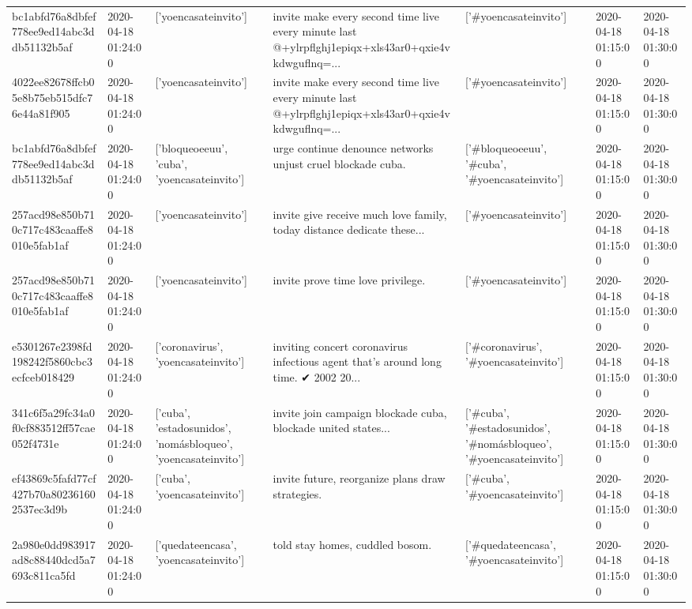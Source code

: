 \begin{tabular}{lllllll}
bc1abfd76a8dbfef778ee9ed14abc3ddb51132b5af & 2020-04-18 01:24:00 & ['yoencasateinvito'] & invite make every second time live every minute last @+ylrpflghj1epiqx+xls43ar0+qxie4vkdwguflnq=... & ['#yoencasateinvito'] & 2020-04-18 01:15:00 & 2020-04-18 01:30:00 \\
4022ee82678ffcb05e8b75eb515dfc76e44a81f905 & 2020-04-18 01:24:00 & ['yoencasateinvito'] & invite make every second time live every minute last @+ylrpflghj1epiqx+xls43ar0+qxie4vkdwguflnq=... & ['#yoencasateinvito'] & 2020-04-18 01:15:00 & 2020-04-18 01:30:00 \\
bc1abfd76a8dbfef778ee9ed14abc3ddb51132b5af & 2020-04-18 01:24:00 & ['bloqueoeeuu', 'cuba', 'yoencasateinvito'] & urge continue denounce networks unjust cruel blockade cuba. & ['#bloqueoeeuu', '#cuba', '#yoencasateinvito'] & 2020-04-18 01:15:00 & 2020-04-18 01:30:00 \\
257acd98e850b710c717c483caaffe8010e5fab1af & 2020-04-18 01:24:00 & ['yoencasateinvito'] & invite give receive much love family, today distance dedicate these... & ['#yoencasateinvito'] & 2020-04-18 01:15:00 & 2020-04-18 01:30:00 \\
257acd98e850b710c717c483caaffe8010e5fab1af & 2020-04-18 01:24:00 & ['yoencasateinvito'] & invite prove time love privilege. & ['#yoencasateinvito'] & 2020-04-18 01:15:00 & 2020-04-18 01:30:00 \\
e5301267e2398fd198242f5860cbc3ecfceb018429 & 2020-04-18 01:24:00 & ['coronavirus', 'yoencasateinvito'] & inviting concert coronavirus infectious agent that's around long time. ✔ 2002 20... & ['#coronavirus', '#yoencasateinvito'] & 2020-04-18 01:15:00 & 2020-04-18 01:30:00 \\
341c6f5a29fc34a0f0cf883512ff57cae052f4731e & 2020-04-18 01:24:00 & ['cuba', 'estadosunidos', 'nomásbloqueo', 'yoencasateinvito'] & invite join campaign blockade cuba, blockade united states... & ['#cuba', '#estadosunidos', '#nomásbloqueo', '#yoencasateinvito'] & 2020-04-18 01:15:00 & 2020-04-18 01:30:00 \\
ef43869c5fafd77cf427b70a802361602537ec3d9b & 2020-04-18 01:24:00 & ['cuba', 'yoencasateinvito'] & invite future, reorganize plans draw strategies. & ['#cuba', '#yoencasateinvito'] & 2020-04-18 01:15:00 & 2020-04-18 01:30:00 \\
2a980e0dd983917ad8c88440dcd5a7693c811ca5fd & 2020-04-18 01:24:00 & ['quedateencasa', 'yoencasateinvito'] & told stay homes, cuddled bosom. & ['#quedateencasa', '#yoencasateinvito'] & 2020-04-18 01:15:00 & 2020-04-18 01:30:00 \\

\end{tabular}
